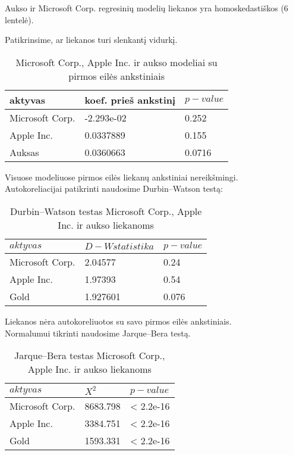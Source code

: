 \documentclass[12pt, a14paper, lithuanian]{article}
\begin{document}
Aukso ir Microsoft Corp. regresinių modelių liekanos yra homoskedastiškos (6 lentelė).

Patikrinsime, ar liekanos turi slenkantį vidurkį.

\begin{table}[ht]
\begin{center}
    \begin{tabular}{ | l | l | l | }
    \hline
    aktyvas  &  koef. prieš ankstinį  & $ p-value $  \\
    \hline
	Microsoft Corp. & -2.293e-02 & 0.252\\
	Apple Inc. & 0.0337889 &  0.155\\
	Auksas & 0.0360663 &  0.0716\\
	\hline
    \end{tabular}
\end{center}
\caption{Microsoft Corp., Apple Inc. ir aukso modeliai su pirmos eilės ankstiniais}
\end{table}

Visuose modeliuose pirmos eilės liekanų ankstiniai nereikšmingi.\\

Autokoreliacijai patikrinti naudosime Durbin--Watson testą:



\begin{table}[ht]
\begin{center}
    \begin{tabular}{ | l | l | l | }
    \hline
    $ aktyvas $ & $ D-W statistika $ & $ p-value $  \\
    \hline
	Microsoft Corp. & 2.04577 &  0.24\\
	Apple Inc. & 1.97393 &  0.54\\
	Gold & 1.927601 &  0.076\\
	\hline
    \end{tabular}
\end{center}
\caption{Durbin--Watson testas Microsoft Corp., Apple Inc. ir aukso liekanoms}
\end{table}

Liekanos nėra autokoreliuotos su savo pirmos eilės ankstiniais.\\

Normalumui tikrinti naudosime Jarque--Bera testą.



\begin{table}[ht]
\begin{center}
    \begin{tabular}{ | l | l | l | }
    \hline
    $ aktyvas $ &  $ X^2 $  & $ p-value $  \\
    \hline
	Microsoft Corp. & 8683.798 & < 2.2e-16\\
	Apple Inc. & 3384.751 & < 2.2e-16\\
	Gold & 1593.331 & < 2.2e-16\\
	\hline
    \end{tabular}
\end{center}
\caption{Jarque--Bera testas Microsoft Corp., Apple Inc. ir aukso liekanoms}
\end{table}
\end{document}

